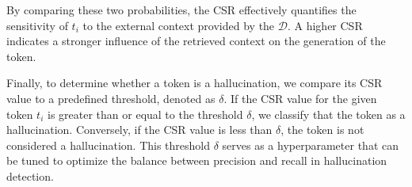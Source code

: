 By comparing these two probabilities, the CSR effectively quantifies the sensitivity of $t_i$ to the external context provided by the $\mathcal{D}$. A higher CSR indicates a stronger influence of the retrieved context on the generation of the token.

Finally, to determine whether a token is a hallucination, we compare its CSR value to a predefined threshold, denoted as $\delta$. If the CSR value for the given token $t_i$ is greater than or equal to the threshold $\delta$, we classify that the token as a hallucination. Conversely, if the CSR value is less than $\delta$, the token is not considered a hallucination. This threshold $\delta$ serves as a hyperparameter that can be tuned to optimize the balance between precision and recall in hallucination detection.
